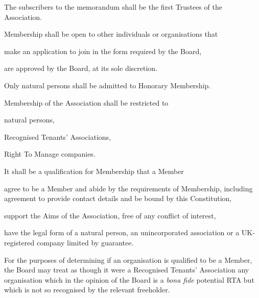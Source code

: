 \documentclass[10pt]{mk-articles-of-association}
\newcommand{\EC}[0]{Board}
\newcommand{\Exec}[0]{\EC{} }
\newcommand{\RTA}[0]{Recognised Tenants' Association}
\begin{document}
\begin{constenum}

  \item The subscribers to the memorandum shall be the first Trustees
    of the Association.

  \item Membership shall be open to other individuals or organisations that
    \begin{constenum}
      \item make an application to join in the form required by the \EC, \ITand
      \item are approved by the \EC{}, at its sole discretion.
    \end{constenum}

  \item Only natural persons shall be admitted to Honorary Membership.

  \item Membership of the Association shall be restricted to
    \begin{constenum}
    \item natural persons,
    \item \RTA{}s, \ITand
    \item Right To Manage companies.
    \end{constenum}

  \item It shall be a qualification for Membership that a Member
    \begin{constenum}

    \item agree to be a Member and abide by the requirements of
      Membership, including agreement to provide contact details and
      be bound by this Constitution,

    \item support the Aims of the Association, free of any conflict
      of interest,

    \item have the legal form of a natural person, an unincorporated
      association or a UK-registered company limited by guarantee.

    \end{constenum}

  \item For the purposes of determining if an organisation is
    qualified to be a Member, the \Exec may treat as though it were a
    \RTA{} any organisation which in the opinion of the \Exec is a
    \textit{bona fide} potential RTA but which is not so recognised by
    the relevant freeholder.



\end{constenum}
\end{document}

